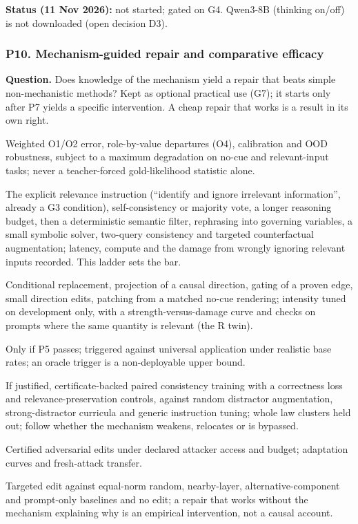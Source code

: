 \documentclass[10pt,a4paper]{article}
\begin{document}
\textbf{Status (11 Nov 2026):} not started; gated on G4. Qwen3-8B (thinking on/off) is not downloaded (open
decision D3).

\subsubsection{P10. Mechanism-guided repair and comparative efficacy}
\label{sec:blockP10}

\textbf{Question.} Does knowledge of the mechanism yield a repair that beats simple non-mechanistic methods?
Kept as optional practical use (G7); it starts only after P7 yields a specific intervention. A cheap repair that
works is a result in its own right.

\begin{description}[leftmargin=1.2em,style=nextline]
\item[P10.1 Operational loss.] Weighted O1/O2 error, role-by-value departures (O4), calibration and OOD robustness,
subject to a maximum degradation on no-cue and relevant-input tasks; never a teacher-forced gold-likelihood
statistic alone.
\item[P10.2 Non-mechanistic ladder (first).] The explicit relevance instruction (``identify and ignore irrelevant
information'', already a G3 condition), self-consistency or majority vote, a longer reasoning budget, then a
deterministic semantic filter, rephrasing into governing variables, a small symbolic solver, two-query consistency
and targeted counterfactual augmentation; latency, compute and the damage from wrongly ignoring relevant inputs
recorded. This ladder sets the bar.
\item[P10.3 Training-free circuit interventions.] Conditional replacement, projection of a causal direction, gating
of a proven edge, small direction edits, patching from a matched no-cue rendering; intensity tuned on development
only, with a strength-versus-damage curve and checks on prompts where the same quantity is relevant (the R twin).
\item[P10.4 Monitor-triggered repair.] Only if P5 passes; triggered against universal application under realistic
base rates; an oracle trigger is a non-deployable upper bound.
\item[P10.5 Training-based mitigation.] If justified, certificate-backed paired consistency training with a
correctness loss and relevance-preservation controls, against random distractor augmentation, strong-distractor
curricula and generic instruction tuning; whole law clusters held out; follow whether the mechanism weakens,
relocates or is bypassed.
\item[P10.6 Attack and defence.] Certified adversarial edits under declared attacker access and budget; adaptation
curves and fresh-attack transfer.
\item[P10.7 Causal linkage.] Targeted edit against equal-norm random, nearby-layer, alternative-component and
prompt-only baselines and no edit; a repair that works without the mechanism explaining why is an empirical
intervention, not a causal account.
\end{description}
\end{document}
